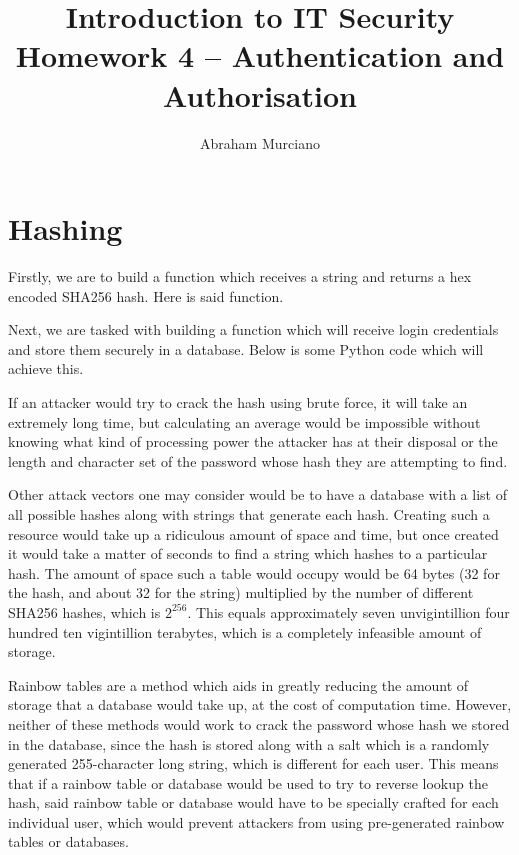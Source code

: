 \documentclass{article}
\title{Introduction to IT Security\\
\medskip
\large Homework 4 -- Authentication and Authorisation}
\author{Abraham Murciano}
\begin{document}
\maketitle

\section{Hashing}

Firstly, we are to build a function which receives a string and returns a hex encoded SHA256 hash. Here is said function.


Next, we are tasked with building a function which will receive login credentials and store them securely in a database. Below is some Python code which will achieve this.


If an attacker would try to crack the hash using brute force, it will take an extremely long time, but calculating an average would be impossible without knowing what kind of processing power the attacker has at their disposal or the length and character set of the password whose hash they are attempting to find.

Other attack vectors one may consider would be to have a database with a list of all possible hashes along with strings that generate each hash. Creating such a resource would take up a ridiculous amount of space and time, but once created it would take a matter of seconds to find a string which hashes to a particular hash. The amount of space such a table would occupy would be 64 bytes (32 for the hash, and about 32 for the string) multiplied by the number of different SHA256 hashes, which is \(2^{256}\). This equals approximately seven unvigintillion four hundred ten vigintillion terabytes, which is a completely infeasible amount of storage.

Rainbow tables are a method which aids in greatly reducing the amount of storage that a database would take up, at the cost of computation time. However, neither of these methods would work to crack the password whose hash we stored in the database, since the hash is stored along with a salt which is a randomly generated 255-character long string, which is different for each user. This means that if a rainbow table or database would be used to try to reverse lookup the hash, said rainbow table or database would have to be specially crafted for each individual user, which would prevent attackers from using pre-generated rainbow tables or databases.
\end{document}
